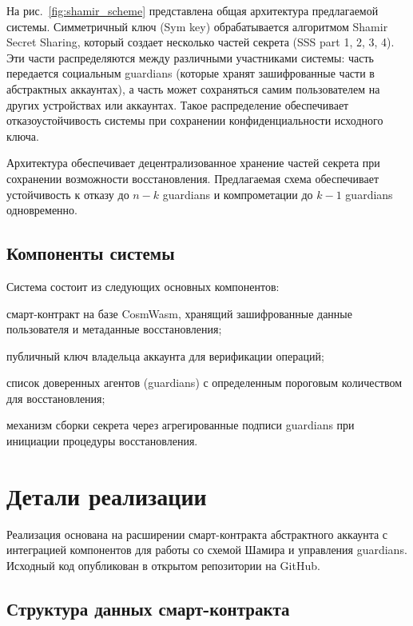 \documentclass[12pt]{a&t}
\begin{document}
На рис.~\ref{fig:shamir_scheme} представлена общая архитектура предлагаемой системы. Симметричный ключ (Sym key) обрабатывается алгоритмом Shamir Secret Sharing, который создает несколько частей секрета (SSS part 1, 2, 3, 4). Эти части распределяются между различными участниками системы: часть передается социальным guardians (которые хранят зашифрованные части в абстрактных аккаунтах), а часть может сохраняться самим пользователем на других устройствах или аккаунтах. Такое распределение обеспечивает отказоустойчивость системы при сохранении конфиденциальности исходного ключа.

Архитектура обеспечивает децентрализованное хранение частей секрета при сохранении возможности восстановления. Предлагаемая схема обеспечивает устойчивость к отказу до $n-k$ guardians и компрометации до $k-1$ guardians одновременно.

\subsection{Компоненты системы}

Система состоит из следующих основных компонентов:
\begin{enumlist}
\item
смарт-контракт на базе CosmWasm, хранящий зашифрованные данные пользователя и метаданные восстановления;
\item
публичный ключ владельца аккаунта для верификации операций;
\item
список доверенных агентов (guardians) с определенным пороговым количеством для восстановления;
\item
механизм сборки секрета через агрегированные подписи guardians при инициации процедуры восстановления.
\end{enumlist}


\section{Детали реализации}

Реализация основана на расширении смарт-контракта абстрактного аккаунта с интеграцией компонентов для работы со схемой Шамира и управления guardians. Исходный код опубликован в открытом репозитории на GitHub.

\subsection{Структура данных смарт-контракта}
\end{document}
